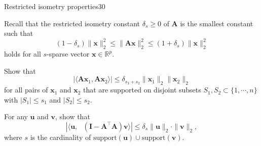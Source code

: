\documentclass{article}
\begin{document}
\begin{problem}{Restricted isometry properties}{30}

Recall that the restricted isometry constant $\delta_s \geq 0$ of 
$\bm{A}$ is the smallest constant such that 
\begin{equation}
  \label{eq:defn-RIP}
  (1-\delta_{s}) \| \bm{x} \|_2^2 \leq \|\bm{A} \bm{x}  \|_2^2 \leq  (1+\delta_{s}) \| \bm{x} \|_2^2
\end{equation}
holds for all $s$-sparse vector $\bm{x} \in \mathbb{R}^p$.

 Show that
$$|\langle \bm{A} \bm{x}_1, \bm{A} \bm{x}_2 \rangle | \leq \delta_{s_1+s_2} \| \bm{x}_1\|_2\|\bm{x}_2\|_2$$
for all pairs of $\bm{x}_1$ and $\bm{x}_2$ that are supported on disjoint subsets $S_1, S_2\subset \{1,\cdots,n\}$ with $|S_1|\leq s_1$ and $|S_2|\leq s_2$.


 For any $\bm{u}$ and $\bm{v}$, show that
\[
|\langle\bm{u},\text{ }(\bm{I}-\bm{A}^{\top}\bm{A})\bm{v}\rangle|\leq\delta_{s}\|\bm{u}\|_2 \cdot\|\bm{v}\|_2,
\]
where $s$ is the cardinality of $\text{support}\left(\bm{u}\right) \cup\text{support}\left(\bm{v}\right)$. 


\end{problem}
\end{document}
